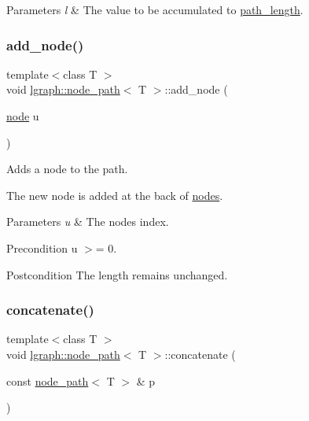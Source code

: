 \begin{DoxyParams}{Parameters}
{\em l} & The value to be accumulated to \hyperlink{classlgraph_1_1node__path_a3461f9839615e5bc4837d24438117f16}{path\+\_\+length}. \\
\hline
\end{DoxyParams}
\mbox{\label{classlgraph_1_1node__path_a273833cfc024fdfbd7ab69002a387f14}} 
\subsubsection{\texorpdfstring{add\+\_\+node()}{add\_node()}}
{\footnotesize\ttfamily template$<$class T $>$ \\
void \hyperlink{classlgraph_1_1node__path}{lgraph\+::node\+\_\+path}$<$ T $>$\+::add\+\_\+node (\begin{DoxyParamCaption}\item[{\hyperlink{namespacelgraph_a397169dd66adf725210a30fb7251773e}{node}}]{u }\end{DoxyParamCaption})}



Adds a node to the path. 

The new node is added at the back of \hyperlink{classlgraph_1_1node__path_ae2335b4883c602186ce2dbba9d679b1e}{nodes}.


\begin{DoxyParams}{Parameters}
{\em u} & The node\textquotesingle{}s index. \\
\hline
\end{DoxyParams}
\begin{DoxyPrecond}{Precondition}
u $>$= 0. 
\end{DoxyPrecond}
\begin{DoxyPostcond}{Postcondition}
The length remains unchanged. 
\end{DoxyPostcond}
\mbox{\label{classlgraph_1_1node__path_a574b282afe2e987afeb4433addebe48e}} 
\subsubsection{\texorpdfstring{concatenate()}{concatenate()}}
{\footnotesize\ttfamily template$<$class T $>$ \\
void \hyperlink{classlgraph_1_1node__path}{lgraph\+::node\+\_\+path}$<$ T $>$\+::concatenate (\begin{DoxyParamCaption}\item[{const \hyperlink{classlgraph_1_1node__path}{node\+\_\+path}$<$ T $>$ \&}]{p }\end{DoxyParamCaption})}



